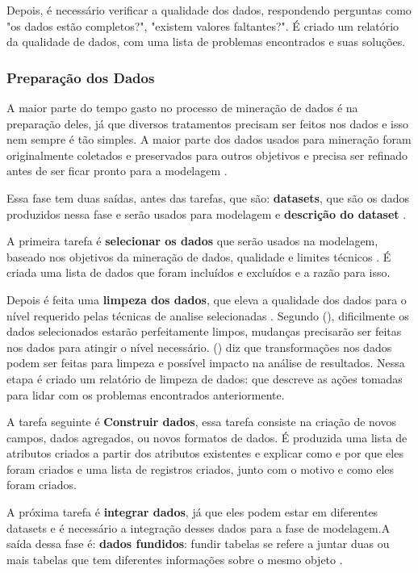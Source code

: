 Depois, é necessário verificar a qualidade dos dados, respondendo perguntas como "os dados estão completos?", "existem valores faltantes?". É criado um relatório da qualidade de dados, com uma lista de problemas encontrados e suas soluções.

\subsubsection{Preparação dos Dados}
A maior parte do tempo gasto no processo de mineração de dados é na preparação deles, já que diversos tratamentos precisam ser feitos nos dados e isso nem sempre é tão simples. A maior parte dos dados usados para mineração foram originalmente coletados e preservados para outros objetivos e precisa ser refinado antes de ser ficar pronto para a modelagem \citep{dmfd}.

Essa fase tem duas saídas, antes das tarefas, que são: \textbf{datasets}, que são os dados produzidos nessa fase e serão usados para modelagem e \textbf{descrição do dataset} \citep{crispmanual}.

A primeira tarefa é \textbf{selecionar os dados} que serão usados na modelagem, baseado nos objetivos da mineração de dados, qualidade e limites técnicos \citep{crispmanual}. É criada uma lista de dados que foram incluídos e excluídos e a razão para isso.

Depois é feita uma \textbf{limpeza dos dados}, que eleva a qualidade dos dados para o nível requerido pelas técnicas de analise selecionadas \citep{crispmanual}. Segundo \citeauthor{dmfd} (\citeyear{dmfd}), dificilmente os dados selecionados estarão perfeitamente limpos, mudanças precisarão ser feitas nos dados para atingir o nível necessário. \citeauthor{crispmanual} (\citeyear{crispmanual}) diz que transformações nos dados podem ser feitas para limpeza e possível impacto na análise de resultados. Nessa etapa é criado um relatório de limpeza de dados: que descreve as ações tomadas para lidar com os problemas encontrados anteriormente.

A tarefa seguinte é \textbf{Construir dados}, essa tarefa consiste na criação de novos campos, dados agregados, ou novos formatos de dados. É produzida uma lista de atributos criados a partir dos atributos existentes e explicar como e por que eles foram criados e uma lista de registros criados, junto com o motivo e como eles foram criados.

A próxima tarefa é \textbf{integrar dados}, já que eles podem estar em diferentes datasets e é necessário a integração desses dados para a fase de modelagem.A saída dessa fase é: \textbf{dados fundidos}: fundir tabelas se refere a juntar duas ou mais tabelas que tem diferentes informações sobre o mesmo objeto \citep{crispmanual}. 

